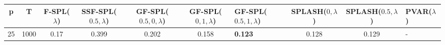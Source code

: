 \begin{tabular}{cccccclccl}
\hline
  p  &  T   &  F-SPL($\lambda$)  &  SSF-SPL($0.5, \lambda$)  &  GF-SPL($0.5, 0, \lambda$)  &  GF-SPL($0, 1, \lambda$)  & GF-SPL($0.5, 1, \lambda$)   &  SPLASH($0, \lambda$)  &  SPLASH($0.5, \lambda$)  & PVAR($\lambda$)   \\
\hline
 25  & 1000 &        0.17        &           0.399           &            0.202            &           0.158           & \textbf{0.123}              &         0.128          &          0.129           & -                 \\
\hline
\end{tabular}